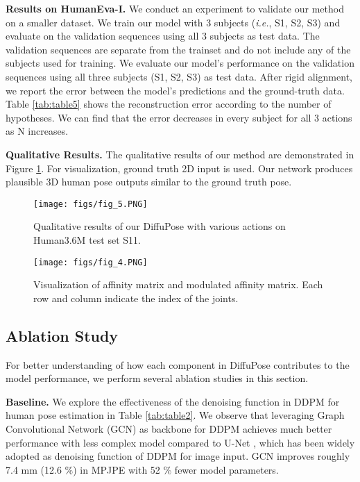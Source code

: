 \documentclass[letterpaper, 10 pt, conference]{ieeeconf}
\begin{document}
\noindent\textbf{Results on HumanEva-I.}
We conduct an experiment to validate our method on a smaller dataset.
We train our model with 3 subjects (\textit{i.e.}, S1, S2, S3) and evaluate on the validation sequences using all 3 subjects as test data.
The validation sequences are separate from the trainset and do not include any of the subjects used for training. We evaluate our model's performance on the validation sequences using all three subjects (S1, S2, S3) as test data. After rigid alignment, we report the error between the model's predictions and the ground-truth data.
Table \ref{tab:table5} shows the reconstruction error according to the number of hypotheses.
We can find that the error decreases in every subject for all 3 actions as N increases.




\noindent\textbf{Qualitative Results.}
The qualitative results of our method are demonstrated in Figure \ref{fig:5}.
For visualization, ground truth 2D input is used.
Our network produces plausible 3D human pose outputs similar to the ground truth pose.

\begin{figure}[t]
    \centering
    \texttt{[image: figs/fig\_5.PNG]}
    \caption{Qualitative results of our DiffuPose with various actions on Human3.6M \cite{ionescu2013human3} test set S11.
    }
    \label{fig:5}
\end{figure}
\begin{figure}[t]
    \centering
    \texttt{[image: figs/fig\_4.PNG]}
    \caption{
    Visualization of affinity matrix and modulated affinity matrix.
    Each row and column indicate the index of the joints.
    }
    \label{fig:4}
    \vspace{-10pt}
\end{figure}


\subsection{Ablation Study}
For better understanding of how each component in DiffuPose contributes to the model performance, we perform several ablation studies in this section.

\noindent\textbf{Baseline.}
We explore the effectiveness of the denoising function in DDPM for human pose estimation in Table \ref{tab:table2}.
We observe that leveraging Graph Convolutional Network (GCN) as backbone for DDPM achieves much better performance with less complex model compared to U-Net \cite{ronneberger2015u}, which has been widely adopted as denoising function of DDPM for image input.
GCN improves roughly 7.4 mm (12.6 $\%$) in MPJPE with 52 $\%$ fewer model parameters.
\end{document}
